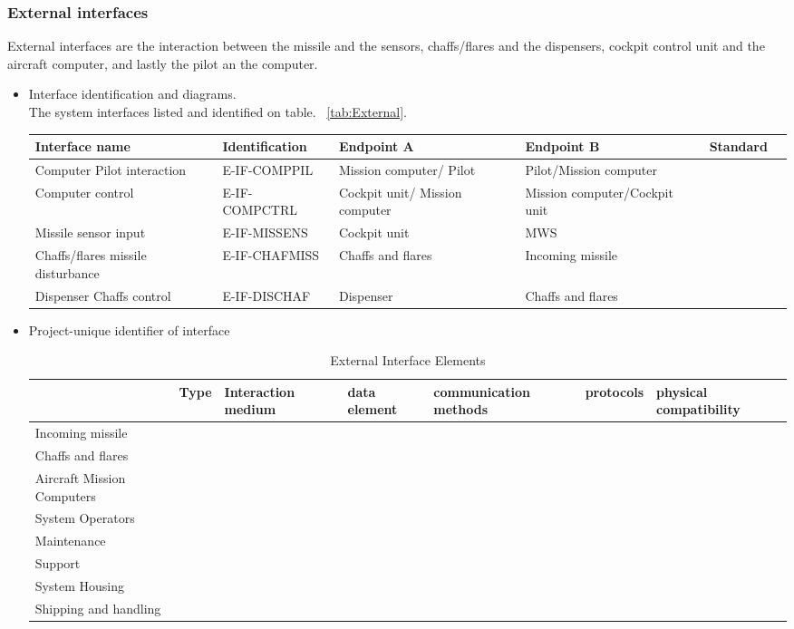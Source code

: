 \subsubsection{External interfaces}
External interfaces are the interaction between the missile and the sensors, chaffs/flares and the dispensers, cockpit control unit and the aircraft computer, and lastly the pilot an the computer.
\begin{itemize}
\item {Interface identification and diagrams.}\\
The system interfaces listed and identified on table. ~\ref{tab:External}.


\begin{center}
\begin{tabular}{ | p{2cm} | l | p{2.3cm} | p{2.3cm} | l | p{1cm} |}
\hline
 \textbf{Interface name} & \textbf{Identification} & \textbf{Endpoint A} & \textbf{Endpoint B} & \textbf{Standard}\\ \hline
Computer Pilot interaction & E-IF-COMPPIL & Mission computer/ Pilot & Pilot/Mission computer & \\ \hline
 Computer control & E-IF-COMPCTRL & Cockpit unit/ Mission computer &Mission computer/Cockpit unit & \\ \hline
Missile sensor input & E-IF-MISSENS & Cockpit unit & MWS & \\ \hline
Chaffs/flares missile disturbance& E-IF-CHAFMISS & Chaffs and flares & Incoming missile & \\ \hline
Dispenser Chaffs control & E-IF-DISCHAF & Dispenser & Chaffs and flares & \\ \hline
\end{tabular}
\end{center}

\item {Project-unique identifier of interface}\\
\begin{table}
\begin{tabular}{ l l l l l l l }
\hline
&Type&Interaction medium&data element&communication methods&protocols&physical compatibility\\
\hline
Incoming missile&&&&&&\\
\hline
Chaffs and flares&&&&&&\\
\hline
Aircraft Mission Computers&&&&&&\\
\hline
System Operators&&&&&&\\
\hline
Maintenance&&&&&&\\
\hline
Support&&&&&&\\
\hline
System Housing&&&&&&\\
\hline
Shipping and handling&&&&&&\\
\hline
\end{tabular}
\caption{External Interface Elements}
\end{table}
\end{itemize}

